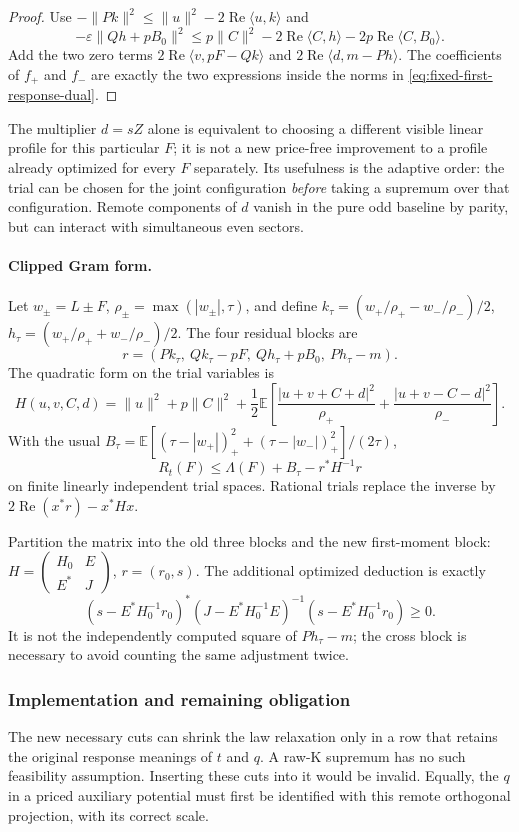 \begin{proof}
Use
$-\|Pk\|^2\le\|u\|^2-2\operatorname{Re}\langle u,k\rangle$
and
\[
-\varepsilon\|Qh+pB_0\|^2
\le p\|C\|^2-2\operatorname{Re}\langle C,h\rangle
                 -2p\operatorname{Re}\langle C,B_0\rangle.
\]
Add the two zero terms
$2\operatorname{Re}\langle v,pF-Qk\rangle$ and
$2\operatorname{Re}\langle d,m-Ph\rangle$.
The coefficients of $f_+$ and $f_-$ are exactly the two expressions
inside the norms in \eqref{eq:fixed-first-response-dual}.
\end{proof}

The multiplier $d=sZ$ alone is equivalent to choosing a different visible
linear profile for this particular $F$; it is not a new price-free
improvement to a profile already optimized for every $F$ separately.
Its usefulness is the adaptive order: the trial can be chosen for the
joint configuration \emph{before} taking a supremum over that configuration.
Remote components of $d$ vanish in the pure odd baseline by parity, but
can interact with simultaneous even sectors.

\paragraph{Clipped Gram form.}
Let $w_\pm=L\pm F$, $\rho_\pm=\max(|w_\pm|,\tau)$, and define
$k_\tau=(w_+/\rho_+-w_-/\rho_-)/2$,
$h_\tau=(w_+/\rho_++w_-/\rho_-)/2$.
The four residual blocks are
\[
 r=(Pk_\tau,\ Qk_\tau-pF,\ Qh_\tau+pB_0,\ Ph_\tau-m).
\]
The quadratic form on the trial variables is
\[
 H(u,v,C,d)=\|u\|^2+p\|C\|^2+
 \frac12\mathbb E\left[
 \frac{|u+v+C+d|^2}{\rho_+}
 +\frac{|u+v-C-d|^2}{\rho_-}\right].
\]
With the usual
$B_\tau=\mathbb E[(\tau-|w_+|)_+^2+(\tau-|w_-|)_+^2]/(2\tau)$,
\[
 R_t(F)\le\Lambda(F)+B_\tau-r^*H^{-1}r
\]
on finite linearly independent trial spaces. Rational trials replace the
inverse by $2\operatorname{Re}(x^*r)-x^*Hx$.

Partition the matrix into the old three blocks and the new first-moment
block: $H=\left(\begin{smallmatrix}H_0&E\\E^*&J\end{smallmatrix}\right)$,
$r=(r_0,s)$. The additional optimized deduction is exactly
\[
 (s-E^*H_0^{-1}r_0)^*
 (J-E^*H_0^{-1}E)^{-1}
 (s-E^*H_0^{-1}r_0)\ge0.
\]
It is not the independently computed square of $Ph_\tau-m$; the
cross block is necessary to avoid counting the same adjustment twice.

\subsubsection{Implementation and remaining obligation}
The new necessary cuts can shrink the law relaxation only in a row that
retains the original response meanings of $t$ and $q$. A raw-K supremum
has no such feasibility assumption. Inserting these cuts into it would
be invalid. Equally, the $q$ in a priced auxiliary potential must first be
identified with this remote orthogonal projection, with its correct scale.

